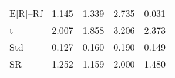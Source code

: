 \begin{tabular}{lrrrr}
\toprule
\midrule
E[R]--Rf & 1.145 & 1.339 & 2.735 & 0.031 \\
t & 2.007 & 1.858 & 3.206 & 2.373 \\
Std & 0.127 & 0.160 & 0.190 & 0.149 \\
SR & 1.252 & 1.159 & 2.000 & 1.480 \\
\bottomrule
\end{tabular}
